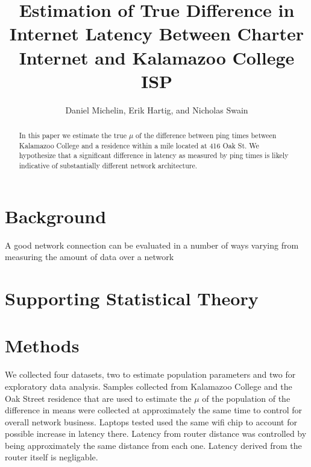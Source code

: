 \documentclass{article}
\begin{document}

\title{Estimation of True Difference in Internet Latency Between Charter Internet and Kalamazoo College ISP}
\author{Daniel Michelin, Erik Hartig, and Nicholas Swain}
\maketitle
\begin{abstract}
In this paper we estimate the true $\mu$ of the difference between ping times between Kalamazoo College and a residence within a mile located at 416 Oak St. We hypothesize that a significant difference in latency as measured by ping times is likely indicative of substantially different network architecture. 
\end{abstract}
\section{Background}
A good network connection can be evaluated in a number of ways varying from measuring the amount of data over a network 
\section{Supporting Statistical Theory}

\section{Methods}
We collected four datasets, two to estimate population parameters and two for exploratory data analysis. Samples collected from Kalamazoo College and the Oak Street residence that are used to estimate the $\mu$ of the population of the difference in means were collected at approximately the same time to control for overall network business. Laptops tested used the same wifi chip to account for possible increase in latency there. Latency from router distance was controlled by being approximately the same distance from each one. Latency derived from the router itself is negligable. 
\end{document}
